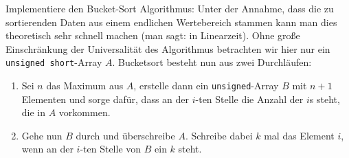 \begin{aufg}
Implementiere den Bucket-Sort Algorithmus: Unter der Annahme, dass die zu sortierenden Daten aus einem endlichen Wertebereich stammen kann man dies theoretisch sehr schnell machen (man sagt: in Linearzeit). Ohne große Einschränkung der Universalität des Algorithmus betrachten wir hier nur ein \verb|unsigned short|-Array $A$. Bucketsort besteht nun aus zwei Durchläufen:
\begin{enumerate}
  \item Sei $n$ das Maximum aus $A$, erstelle dann ein \verb|unsigned|-Array $B$ mit $n+1$ Elementen und sorge dafür, dass an der $i$-ten Stelle die Anzahl der $i$s steht, die in $A$ vorkommen.
  \item Gehe nun $B$ durch und überschreibe $A$. Schreibe dabei $k$ mal das Element $i$, wenn an der $i$-ten Stelle von $B$ ein $k$ steht.
\end{enumerate}

\end{aufg}